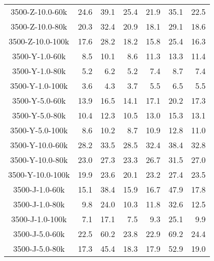 \begin{longtable}{crrrrrr}
      3500-Z-10.0-60k &        24.6 &        39.1 &        25.4 &           21.9 &           35.1 &           22.5 \\
      3500-Z-10.0-80k &        20.3 &        32.4 &        20.9 &           18.1 &           29.1 &           18.6 \\
      3500-Z-10.0-100k &        17.6 &        28.2 &        18.2 &           15.8 &           25.4 &           16.3 \\
      3500-Y-1.0-60k &         8.5 &        10.1 &         8.6 &           11.3 &           13.3 &           11.4 \\
      3500-Y-1.0-80k &         5.2 &         6.2 &         5.2 &            7.4 &            8.7 &            7.4 \\
      3500-Y-1.0-100k &         3.6 &         4.3 &         3.7 &            5.5 &            6.5 &            5.5 \\
      3500-Y-5.0-60k &        13.9 &        16.5 &        14.1 &           17.1 &           20.2 &           17.3 \\
      3500-Y-5.0-80k &        10.4 &        12.3 &        10.5 &           13.0 &           15.3 &           13.1 \\
      3500-Y-5.0-100k &         8.6 &        10.2 &         8.7 &           10.9 &           12.8 &           11.0 \\
      3500-Y-10.0-60k &        28.2 &        33.5 &        28.5 &           32.4 &           38.4 &           32.8 \\
      3500-Y-10.0-80k &        23.0 &        27.3 &        23.3 &           26.7 &           31.5 &           27.0 \\
      3500-Y-10.0-100k &        19.9 &        23.6 &        20.1 &           23.2 &           27.4 &           23.5 \\
      3500-J-1.0-60k &        15.1 &        38.4 &        15.9 &           16.7 &           47.9 &           17.8 \\
      3500-J-1.0-80k &         9.8 &        24.0 &        10.3 &           11.8 &           32.6 &           12.5 \\
      3500-J-1.0-100k &         7.1 &        17.1 &         7.5 &            9.3 &           25.1 &            9.9 \\
      3500-J-5.0-60k &        22.5 &        60.2 &        23.8 &           22.9 &           69.2 &           24.4 \\
      3500-J-5.0-80k &        17.3 &        45.4 &        18.3 &           17.9 &           52.9 &           19.0 \\

\end{longtable}
